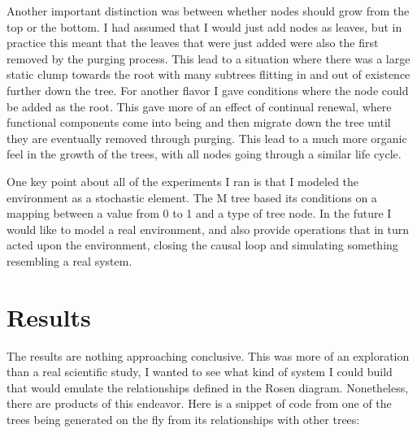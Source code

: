 \documentclass[12pt]{article}
\begin{document}
Another important distinction was between whether nodes should grow from the top or the bottom.  I had assumed that I would just add nodes as leaves, but in practice this meant that the leaves that were just added were also the first removed by the purging process.  This lead to a situation where there was a large static clump towards the root with many subtrees flitting in and out of existence further down the tree.  For another flavor I gave conditions where the node could be added as the root.  This gave more of an effect of continual renewal, where functional components come into being and then migrate down the tree until they are eventually removed through purging.  This lead to a much more organic feel in the growth of the trees, with all nodes going through a similar life cycle.  

One key point about all of the experiments I ran is that I modeled the environment as a stochastic element.  The M tree based its conditions on a mapping between a value from 0 to 1 and a type of tree node.  In the future I would like to model a real environment, and also provide operations that in turn acted upon the environment, closing the causal loop and simulating something resembling a real system.  

\section{Results}

The results are nothing approaching conclusive.  This was more of an exploration than a real scientific study, I wanted to see what kind of system I could build that would emulate the relationships defined in the Rosen diagram.  Nonetheless, there are products of this endeavor.  Here is a snippet of code from one of the trees being generated on the fly from its relationships with other trees:
\end{document}
